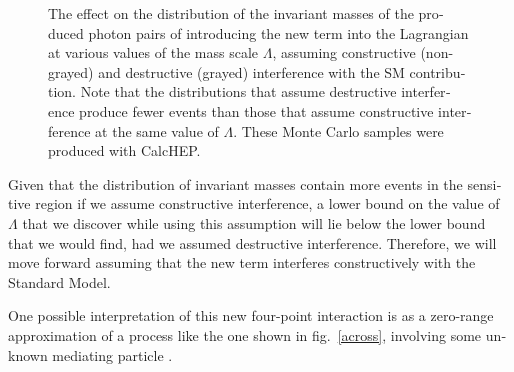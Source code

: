 \begin{english}
\begin{new}
\begin{figure}[hbt]
\begin{minipage}[b]{.69\textwidth}
\begin{infilsf} \tiny \makebox[0pt][l]{
\hspace{-1em}
}\end{infilsf} \end{minipage}
\hfill\begin{minipage}[b]{.3\textwidth}
\caption{The effect on the distribution of the invariant masses of the produced photon pairs of introducing the new term into the Lagrangian at various values of the mass scale $\Lambda$, assuming constructive (non-grayed) and destructive (grayed) interference with the SM contribution. Note that the distributions that assume destructive interference produce fewer events than those that assume constructive interference at the same value of $\Lambda$. These Monte Carlo samples were produced with CalcHEP.
\label{interf}}
\end{minipage}
\end{figure}

Given that the distribution of invariant masses contain more events in the sensitive region if we assume constructive interference, a lower bound on the value of $\Lambda$ that we discover while using this assumption will lie below the lower bound that we would find, had we assumed destructive interference. Therefore, we will move forward assuming that the new term interferes constructively with the Standard Model.
\end{new}

One possible interpretation of this new four-point interaction is as a zero-range approximation of a process like the one shown in fig.~\ref{across}, involving some unknown mediating particle \cite{marshaw:zerorange}.


\end{english}
